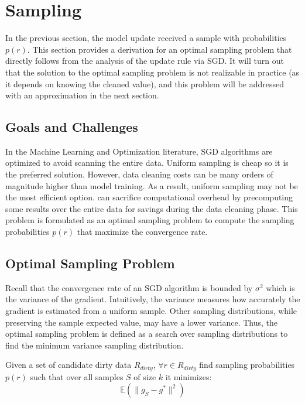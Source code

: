 \section{Sampling}\label{dist-samp}
In the previous section, the model update received a sample with probabilities $p(r)$.
This section provides a derivation for an optimal sampling problem that directly follows from the analysis of the update rule via SGD.
It will turn out that the solution to the optimal sampling problem is not realizable in practice (as it depends on knowing the cleaned value), and this problem will be addressed with an approximation in the next section.

\subsection{Goals and Challenges}
In the Machine Learning and Optimization literature, SGD algorithms are optimized to avoid scanning the entire data.
Uniform sampling is cheap so it is the preferred solution.
However, data cleaning costs can be many orders of magnitude higher than model training.
As a result, uniform sampling may not be the most efficient option.
\sys can sacrifice computational overhead by precomputing some results over the entire data for savings during the data cleaning phase.
This problem is formulated as an optimal sampling problem to compute the sampling probabilities $p(r)$ that maximize the convergence rate.

\subsection{Optimal Sampling Problem}
Recall that the convergence rate of an SGD algorithm is bounded by $\sigma^2$ which is the variance of the gradient.
Intuitively, the variance measures how accurately the gradient is estimated from a uniform sample.
Other sampling distributions, while preserving the sample expected value, may have a lower variance.
Thus, the optimal sampling problem is defined as a search over sampling distributions to find the minimum variance sampling distribution.

\begin{definition}
Given a set of candidate dirty data $R_{dirty}$, $\forall r \in R_{dirty}$ find sampling probabilities $p(r)$ such that over all samples $S$ of size $k$ it minimizes:
\[
\mathbb{E}(\|g_S - g^*\|^2)
\]
\end{definition}

